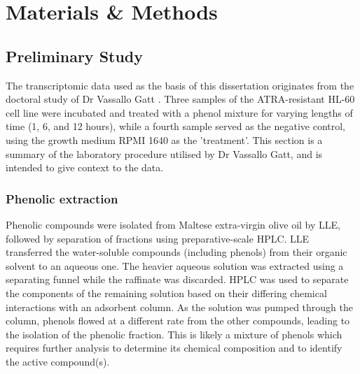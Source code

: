 \chapter{Materials \& Methods}
\label{method}



\section{Preliminary Study}%
\label{method:prelim study}
The transcriptomic data used as the basis of this dissertation originates from the doctoral study of Dr Vassallo Gatt  \citep{Gatt2016}. Three samples of the \ac{ATRA}-resistant HL-60 cell line were incubated and treated with a phenol mixture for varying lengths of time (1, 6, and 12 hours), while a fourth sample served as the negative control, using the growth medium RPMI 1640 as the 'treatment'. This section is a summary of the laboratory procedure utilised by Dr Vassallo Gatt, and is intended to give context to the data.

\subsection{Phenolic extraction}%
Phenolic compounds were isolated from Maltese extra-virgin olive oil by \ac{LLE}, followed by separation of fractions using preparative-scale \ac{HPLC}. \ac{LLE} transferred the water-soluble compounds (including phenols) from their organic solvent to an aqueous one. The heavier aqueous solution was extracted using a separating funnel while the raffinate was discarded. \ac{HPLC} was used to separate the components of the remaining solution based on their differing chemical interactions with an adsorbent column. As the solution was pumped through the column, phenols flowed at a different rate from the other compounds, leading to the isolation of the phenolic fraction. This is likely a mixture of phenols which requires further analysis to determine its chemical composition and to identify the active compound(s).

